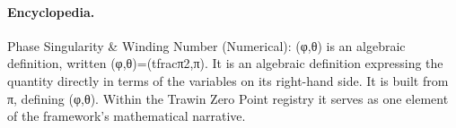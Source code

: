 \paragraph{Encyclopedia.}
Phase Singularity \& Winding Number (Numerical): (φ,θ) is an algebraic definition, written (φ,θ)=(tfracπ2,π). It is an algebraic definition expressing the quantity directly in terms of the variables on its right-hand side. It is built from π, defining (φ,θ). Within the Trawin Zero Point registry it serves as one element of the framework's mathematical narrative.
